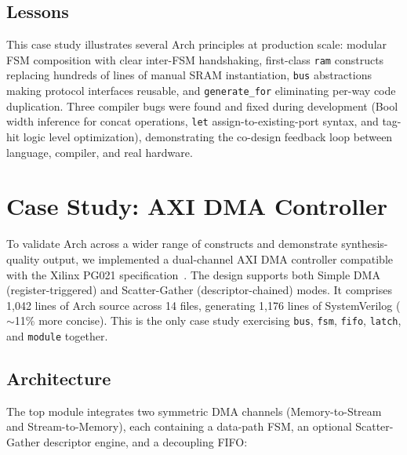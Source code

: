 \documentclass[manuscript]{acmart}
\begin{document}
\subsection{Lessons}

This case study illustrates several Arch principles at production scale: modular FSM composition with clear inter-FSM handshaking, first-class \texttt{ram} constructs replacing hundreds of lines of manual SRAM instantiation, \texttt{bus} abstractions making protocol interfaces reusable, and \texttt{generate\_for} eliminating per-way code duplication. Three compiler bugs were found and fixed during development (Bool width inference for concat operations, \texttt{let} assign-to-existing-port syntax, and tag-hit logic level optimization), demonstrating the co-design feedback loop between language, compiler, and real hardware.

\section{Case Study: AXI DMA Controller}\label{sec:axidma}

To validate Arch across a wider range of constructs and demonstrate synthesis-quality output, we implemented a dual-channel AXI DMA controller compatible with the Xilinx PG021 specification~\cite{pg021}. The design supports both Simple DMA (register-triggered) and Scatter-Gather (descriptor-chained) modes. It comprises 1,042 lines of Arch source across 14 files, generating 1,176 lines of SystemVerilog (${\sim}$11\% more concise). This is the only case study exercising \texttt{bus}, \texttt{fsm}, \texttt{fifo}, \texttt{latch}, and \texttt{module} together.

\subsection{Architecture}

The top module integrates two symmetric DMA channels (Memory-to-Stream and Stream-to-Memory), each containing a data-path FSM, an optional Scatter-Gather descriptor engine, and a decoupling FIFO:
\end{document}
